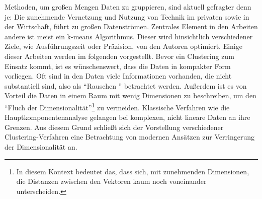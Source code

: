 Methoden, um großen Mengen Daten zu gruppieren, sind aktuell gefragter denn je: Die zunehmende Vernetzung und Nutzung von Technik im privaten sowie in der Wirtschaft, führt zu großen Datenströmen. Zentrales Element in den Arbeiten andere ist meist ein k-means Algorithmus. Dieser wird hinsichtlich verschiedener Ziele, wie Ausführungszeit oder Präzision, von den Autoren optimiert.  Einige dieser Arbeiten werden im folgenden vorgestellt.\newline
Bevor ein Clustering zum Einsatz kommt, ist es wünschenswert, dass die Daten in kompakter Form vorliegen. Oft sind in den Daten viele Informationen vorhanden, die nicht substantiell sind, also als \enquote{Rauschen } betrachtet werden. Außerdem ist es von Vorteil die Daten in einem Raum mit wenig Dimensionen zu beschreiben, um den \enquote{Fluch der Dimensionalität}\footnote{In diesem Kontext bedeutet das, dass sich, mit zunehmenden Dimensionen, die Distanzen zwischen den Vektoren kaum noch voneinander unterscheiden.} zu vermeiden. Klassische Verfahren wie die Hauptkomponentenanalyse gelangen bei komplexen, nicht lineare Daten an ihre Grenzen. Aus diesem Grund schließt sich der Vorstellung verschiedener Clustering-Verfahren eine Betrachtung von modernen Ansätzen zur Verringerung der Dimensionalität an.\newline

